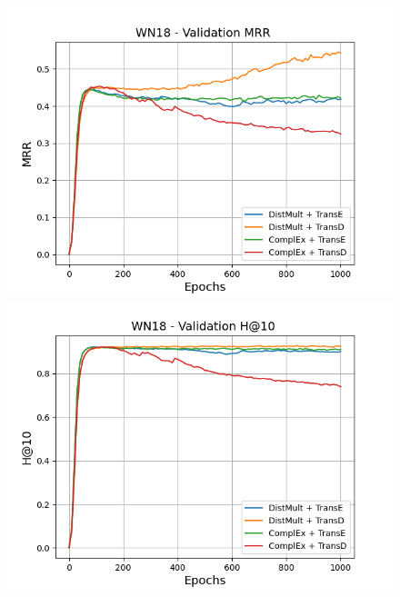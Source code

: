 \begin{figure}[H]
    \centering
    \begin{minipage}{.5\textwidth}
      \centering
      \includegraphics[width=\linewidth]{figures/results/gan_train/not_pretrained/uncertainty/max/entropy/wn18/1k_epochs/uncertainty_wn18_mrrs.png}
    \end{minipage}%
    \begin{minipage}{.5\textwidth}
      \centering
      \includegraphics[width=\linewidth]{figures/results/gan_train/not_pretrained/uncertainty/max/entropy/wn18/1k_epochs/uncertainty_wn18_hit10.png}
    \end{minipage}
    

\end{figure}
